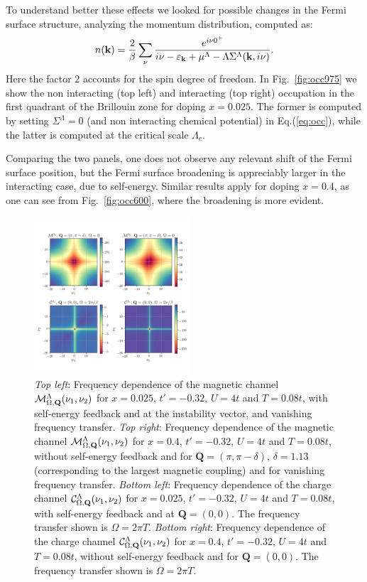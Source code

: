 To understand better these effects we looked for possible changes in the Fermi surface structure, analyzing the momentum distribution, computed as: 
\begin{equation}
 n(\mathbf{k})  = \frac{2}{\beta} \sum_{\nu}\frac{e^{i\nu 0^+}}{i\nu-\varepsilon_{\mathbf{k}}+\mu^\Lambda-\Lambda\Sigma^\Lambda(\mathbf{k},i\nu)}.
 \label{eq:occ} 
\end{equation}
Here the factor $2$ accounts for the spin degree of freedom. 
In Fig.~\ref{fig:occ975} we show the non interacting (top left) and interacting (top right) occupation in the first quadrant of the Brillouin zone for doping $x=0.025$.
The former is computed by setting $\Sigma^\Lambda=0$ (and non interacting chemical potential) in Eq.(\ref{eq:occ}), while the latter is computed at the critical scale $\Lambda_c$. 

Comparing the two panels, one does not observe any relevant shift of the Fermi surface position, but the Fermi surface broadening is appreciably larger in the interacting case, due to self-energy.
Similar results apply for doping $x=0.4$, as one can see from Fig.~\ref{fig:occ600}, where the broadening is more evident.  

\begin{figure}
\hspace*{-1.0cm}
\includegraphics[width=0.52\textwidth]{images/Phi_color_all.png}
\caption{\emph{Top left}: Frequency dependence of the magnetic channel $\mathcal{M}^\Lambda_{\Omega,\mathbf{Q}}(\nu_1,\nu_2)$ for $x=0.025$, $t'=-0.32$, $U=4t$ and $T=0.08t$, with self-energy feedback and at the instability vector, and vanishing frequency transfer.
\emph{Top right}: Frequency dependence of the magnetic channel $\mathcal{M}^\Lambda_{\Omega,\mathbf{Q}}(\nu_1,\nu_2)$ for $x=0.4$, $t'=-0.32$, $U=4t$ and $T=0.08t$, without self-energy feedback and for $\mathbf{Q}=(\pi,\pi-\delta)$, $\delta=1.13$ (corresponding to the largest magnetic coupling) and for vanishing frequency transfer.
\emph{Bottom left}:  Frequency dependence of the charge channel $\mathcal{C}^\Lambda_{\Omega,\mathbf{Q}}(\nu_1,\nu_2)$ for $x=0.025$, $t'=-0.32$, $U=4t$ and $T=0.08t$, with self-energy feedback and at $\mathbf{Q}=(0,0)$. The frequency transfer shown is $\Omega=2\pi T$.
\emph{Bottom right}: Frequency dependence of the charge channel $\mathcal{C}^\Lambda_{\Omega,\mathbf{Q}}(\nu_1,\nu_2)$ for $x=0.4$, $t'=-0.32$, $U=4t$ and $T=0.08t$, without self-energy feedback and for $\mathbf{Q}=(0,0)$. The frequency transfer shown is $\Omega=2\pi T$.
}  
\label{fig:freqplot} 
\end{figure}

